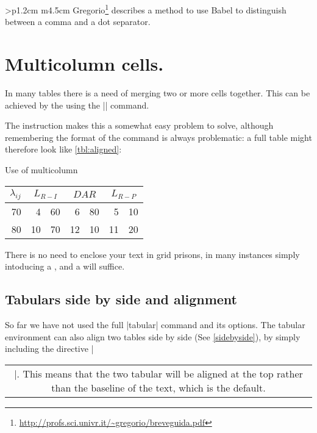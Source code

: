 \begin{tabular}{>{\bfseries}p{1.2cm} m{4.5cm}}
Gregorio\footnote{\url{http://profs.sci.univr.it/~gregorio/breveguida.pdf}} describes a method to use Babel to distinguish between a comma and a dot separator.

\section{Multicolumn cells.}

In many tables there is a need of merging two or more cells together. This can be achieved by the using the |\multicolumn| command. 

The \cmd{\multicolumn} instruction makes this a somewhat easy problem to solve, although remembering the format of the command is always problematic: a full table might therefore look like \ref{tbl:aligned}:

\begin{texexample}{Use of multicolumn}{}
\centering
\begin{tabular}{rr@{.}lr@{ = }lr@{.}l}
\toprule
$\lambda_{ij}$&\multicolumn{2}{c}{$L_{R-I}$}&
\multicolumn{2}{c}{$DAR$}&
\multicolumn{2}{c}{$L_{R-P}$}\\
\midrule
70&4&60&6&80&5&10\\
80&10&70&12&10&11&20\\
\bottomrule
\end{tabular}

\label{tbl:aligned}
\end{texexample}


There is no need to enclose your text in grid prisons, in many instances simply intoducing a 
\cmd{\toprule}, \cmd{\midrule} and a \cmd{\bottomrule} will suffice.

\subsection{Tabulars side by side and alignment}

So far we have not used the full |tabular| command and its options.  The tabular environment can also align two tables side by side (See \ref{sidebyside}), by simply including the directive |\begin{tabular}[t]{|c|}|. This means that the two tabular will be aligned at the top rather than the baseline of the text, which is the default.


\end{tabular}
\end{tabular}
